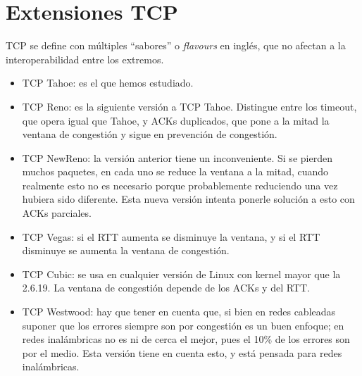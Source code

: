 \section{Extensiones TCP}
TCP se define con múltiples ``sabores'' o \textit{flavours} en inglés, que no afectan a la interoperabilidad entre los extremos. 
\begin{itemize}
    \item TCP Tahoe: es el que hemos estudiado.
    \item TCP Reno: es la siguiente versión a TCP Tahoe. Distingue entre los timeout, que opera igual que Tahoe, y ACKs duplicados, que pone a la mitad la ventana de congestión y sigue en prevención de congestión. 
    \item TCP NewReno: la versión anterior tiene un inconveniente. Si se pierden muchos paquetes, en cada uno se reduce la ventana a la mitad, cuando realmente esto no es necesario porque probablemente reduciendo una vez hubiera sido diferente. Esta nueva versión intenta ponerle solución a esto con ACKs parciales. 
    \item TCP Vegas: si el \acrshort{RTT} aumenta se disminuye la ventana, y si el \acrshort{RTT} disminuye se aumenta la ventana de congestión.
    \item TCP Cubic: se usa en cualquier versión de Linux con kernel mayor que la 2.6.19. La ventana de congestión depende de los ACKs y del \acrshort{RTT}. 
    \item TCP Westwood: hay que tener en cuenta que, si bien en redes cableadas suponer que los errores siempre son por congestión es un buen enfoque; en redes inalámbricas no es ni de cerca el mejor, pues el 10\% de los errores son por el medio. Esta versión tiene en cuenta esto, y está pensada para redes inalámbricas.
\end{itemize}

